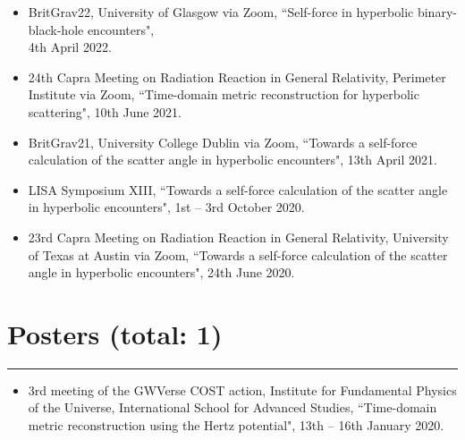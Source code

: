 \documentclass[10.5pt, oneside]{article}   	%
\begin{document}
\begin{itemize}
\item BritGrav22, University of Glasgow via Zoom, ``Self-force in hyperbolic binary-black-hole encounters", \\ 4th April 2022. \href{https://www.youtube.com/watch?v=zZEblkjb5IM}{}
\item 24th Capra Meeting on Radiation Reaction in General Relativity, Perimeter Institute via Zoom, ``Time-domain metric reconstruction for hyperbolic scattering", 10th June 2021. \href{https://pirsa.org/21060058}{}
\item BritGrav21, University College Dublin via Zoom, ``Towards a self-force calculation of the scatter angle in hyperbolic encounters", 13th April 2021. \href{https://oliverlong.info/talks/britgrav21}{}
\item LISA Symposium XIII, ``Towards a self-force calculation of the scatter angle in hyperbolic encounters", 1st -- 3rd October 2020. \href{https://lisasymposium13.lisamission.org/presentations/i0xMnRFWi7WKbO5f01caGDH0zPK2/7qz7uYC3qHuzj9AsC49h}{}
\item 23rd Capra Meeting on Radiation Reaction in General Relativity, University of Texas at Austin via Zoom, ``Towards a self-force calculation of the scatter angle in hyperbolic encounters", 24th June 2020. \href{https://www.youtube.com/watch?v=HB-Rw5kRUfg&t=11311s}{}
\end{itemize} 
 
{\color{Sectioncolour}
\section*{Posters {\rm (total: 1)}}
\vspace{-3mm}
\noindent\rule{\linewidth}{0.6pt}}
\begin{itemize}
\item 3rd meeting of the GWVerse COST action, Institute for Fundamental Physics of the Universe, International School for Advanced Studies, ``Time-domain metric reconstruction using the Hertz potential", 13th -- 16th January 2020.
\end{itemize} 
\end{document}
